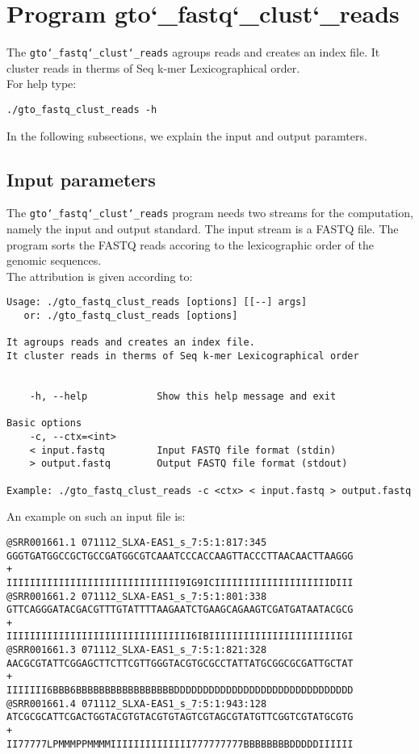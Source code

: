 \section{Program gto\char`_fastq\char`_clust\char`_reads}
The \texttt{gto\char`_fastq\char`_clust\char`_reads} agroups reads and creates an index file. It cluster reads in therms of Seq k-mer Lexicographical order.\\
For help type:
\begin{lstlisting}
./gto_fastq_clust_reads -h
\end{lstlisting}
In the following subsections, we explain the input and output paramters.

\subsection*{Input parameters}

The \texttt{gto\char`_fastq\char`_clust\char`_reads} program needs two streams for the computation,
namely the input and output standard. The input stream is a FASTQ file. The program sorts the FASTQ reads accoring to the lexicographic order of the genomic sequences.\\
The attribution is given according to:
\begin{lstlisting}
Usage: ./gto_fastq_clust_reads [options] [[--] args]
   or: ./gto_fastq_clust_reads [options]

It agroups reads and creates an index file.
It cluster reads in therms of Seq k-mer Lexicographical order


    -h, --help            Show this help message and exit

Basic options
    -c, --ctx=<int>       
    < input.fastq         Input FASTQ file format (stdin)
    > output.fastq        Output FASTQ file format (stdout)

Example: ./gto_fastq_clust_reads -c <ctx> < input.fastq > output.fastq
\end{lstlisting}
An example on such an input file is:
\begin{lstlisting}
@SRR001661.1 071112_SLXA-EAS1_s_7:5:1:817:345
GGGTGATGGCCGCTGCCGATGGCGTCAAATCCCACCAAGTTACCCTTAACAACTTAAGGG
+
IIIIIIIIIIIIIIIIIIIIIIIIIIIIII9IG9ICIIIIIIIIIIIIIIIIIIIIDIII
@SRR001661.2 071112_SLXA-EAS1_s_7:5:1:801:338
GTTCAGGGATACGACGTTTGTATTTTAAGAATCTGAAGCAGAAGTCGATGATAATACGCG
+
IIIIIIIIIIIIIIIIIIIIIIIIIIIIIIII6IBIIIIIIIIIIIIIIIIIIIIIIIGI
@SRR001661.3 071112_SLXA-EAS1_s_7:5:1:821:328
AACGCGTATTCGGAGCTTCTTCGTTGGGTACGTGCGCCTATTATGCGGCGCGATTGCTAT
+
IIIIIII6BBB6BBBBBBBBBBBBBBBBBDDDDDDDDDDDDDDDDDDDDDDDDDDDDDDD
@SRR001661.4 071112_SLXA-EAS1_s_7:5:1:943:128
ATCGCGCATTCGACTGGTACGTGTACGTGTAGTCGTAGCGTATGTTCGGTCGTATGCGTG
+
II77777LPMMMPPMMMMIIIIIIIIIIIIII777777777BBBBBBBBDDDDDIIIIII
\end{lstlisting}

